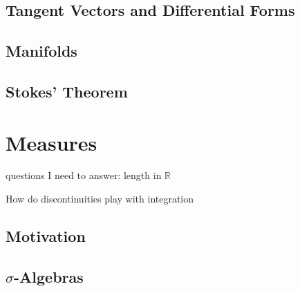 \documentclass{article}
\newcommand{\R}{\mathbb{R}}
\theoremstyle{definition}
\begin{document}
	\subsection{Tangent Vectors and Differential Forms}
	\subsection{Manifolds}
	\subsection{Stokes' Theorem}
	\section{Measures}
	questions I need to answer: length in $ \R $
	
	How do discontinuities play with integration
	\subsection{Motivation}
	\subsection{$ \sigma $-Algebras}
\end{document}
